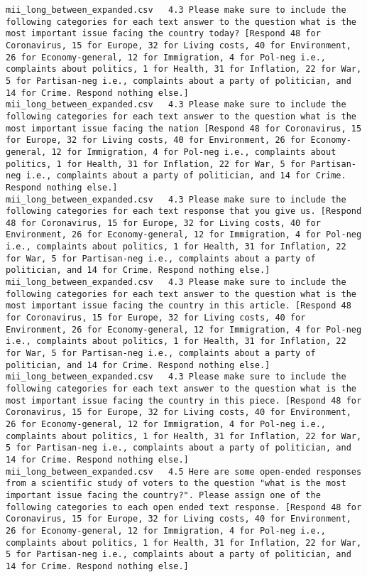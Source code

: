 \begin{lstlisting}[label=lst:promptvariants]
mii_long_between_expanded.csv	4.3	Please make sure to include the following categories for each text answer to the question what is the most important issue facing the country today? [Respond 48 for Coronavirus, 15 for Europe, 32 for Living costs, 40 for Environment, 26 for Economy-general, 12 for Immigration, 4 for Pol-neg i.e., complaints about politics, 1 for Health, 31 for Inflation, 22 for War, 5 for Partisan-neg i.e., complaints about a party of politician, and 14 for Crime. Respond nothing else.]
mii_long_between_expanded.csv	4.3	Please make sure to include the following categories for each text answer to the question what is the most important issue facing the nation [Respond 48 for Coronavirus, 15 for Europe, 32 for Living costs, 40 for Environment, 26 for Economy-general, 12 for Immigration, 4 for Pol-neg i.e., complaints about politics, 1 for Health, 31 for Inflation, 22 for War, 5 for Partisan-neg i.e., complaints about a party of politician, and 14 for Crime. Respond nothing else.]
mii_long_between_expanded.csv	4.3	Please make sure to include the following categories for each text response that you give us. [Respond 48 for Coronavirus, 15 for Europe, 32 for Living costs, 40 for Environment, 26 for Economy-general, 12 for Immigration, 4 for Pol-neg i.e., complaints about politics, 1 for Health, 31 for Inflation, 22 for War, 5 for Partisan-neg i.e., complaints about a party of politician, and 14 for Crime. Respond nothing else.]
mii_long_between_expanded.csv	4.3	Please make sure to include the following categories for each text answer to the question what is the most important issue facing the country in this article. [Respond 48 for Coronavirus, 15 for Europe, 32 for Living costs, 40 for Environment, 26 for Economy-general, 12 for Immigration, 4 for Pol-neg i.e., complaints about politics, 1 for Health, 31 for Inflation, 22 for War, 5 for Partisan-neg i.e., complaints about a party of politician, and 14 for Crime. Respond nothing else.]
mii_long_between_expanded.csv	4.3	Please make sure to include the following categories for each text answer to the question what is the most important issue facing the country in this piece. [Respond 48 for Coronavirus, 15 for Europe, 32 for Living costs, 40 for Environment, 26 for Economy-general, 12 for Immigration, 4 for Pol-neg i.e., complaints about politics, 1 for Health, 31 for Inflation, 22 for War, 5 for Partisan-neg i.e., complaints about a party of politician, and 14 for Crime. Respond nothing else.]
mii_long_between_expanded.csv	4.5	Here are some open-ended responses from a scientific study of voters to the question "what is the most important issue facing the country?". Please assign one of the following categories to each open ended text response. [Respond 48 for Coronavirus, 15 for Europe, 32 for Living costs, 40 for Environment, 26 for Economy-general, 12 for Immigration, 4 for Pol-neg i.e., complaints about politics, 1 for Health, 31 for Inflation, 22 for War, 5 for Partisan-neg i.e., complaints about a party of politician, and 14 for Crime. Respond nothing else.]

\end{lstlisting}
